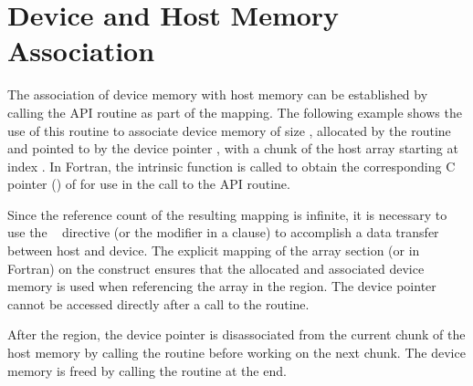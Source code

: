 \newpage
\section{Device and Host Memory Association}
\label{sec:target_associate_ptr}

The association of device memory with host memory
can be established by calling the  
API routine as part of the mapping.
The following example shows the use of this routine
to associate device memory of size , 
allocated by the  routine and
pointed to by the device pointer , 
with a chunk of the host array  starting at index .
In Fortran, the intrinsic function  is called
to obtain the corresponding C pointer () of  
for use in the call to the API routine.

Since the reference count of the resulting mapping is infinite,
it is necessary to use the ~ directive (or
the  modifier in a  clause) to accomplish a
data transfer between host and device.
The explicit mapping of the array section  
(or  in Fortran) on the 
construct ensures that the allocated and associated device memory is used 
when referencing the array  in the  region.
The device pointer  cannot be accessed directly 
after a call to the  routine.

After the  region, the device pointer is disassociated from
the current chunk of the host memory by calling the  routine before working on the next chunk.
The device memory is freed by calling the 
routine at the end.




